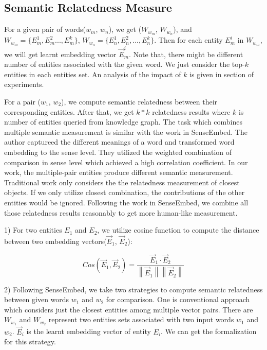

\subsection{Semantic Relatedness Measure}
\label{sec:measure}
For a given pair of words($w_m$, $w_n$), we get ($W_{w_m}$, $W_{w_n}$), and $W_{w_m}=\{E_m^1,E_m^2...,E_m^k\}$,
$W_{w_n}=\{E_n^1,E_n^2,...,E_n^k\}$. Then for each entity $E_m^i$ in $W_{w_m}$, we will get learnt embedding vector
$\overrightarrow E_m^i$.
Note that, there might be different number of entities associated with the given
word. We just consider the top-$k$ entities in each entities set. An analysis of the impact of $k$ is
given in section of experiments.

For a pair ($w_1$, $w_2$), we compute semantic relatedness between their corresponding entities. After that, we
get $k*k$ relatedness results where $k$ is number of entities queried from knowledge graph.
The task which combines multiple semantic measurement is similar with the work in SenseEmbed\cite{acl/IacobacciPN15}.
The author captureed the different meanings of a word and transformed word embedding to the sense level.
They utilized the weighted combination of comparison in sense level which achieved a high correlation coefficient.
In our work, the multiple-pair entities produce different semantic measurement. Traditional work only considers the
the relatedness measurement of closest objects. If we only utilize closest combination, the contributions of the other
entities would be ignored. Following the work in SenseEmbed, we combine all those relatedness
results reasonably to get more human-like measurement.

1) For two entities $E_1$ and $E_2$, we utilize cosine function to compute the
distance between two embedding vectors($\overrightarrow E_1$, $\overrightarrow E_2$):

\begin{small}
    \begin{equation}
        \label{cos}
        \nonumber
        Cos(\overrightarrow E_1,\overrightarrow E_2) = \frac{\overrightarrow E_1 \cdot 
        \overrightarrow E_2}{\left \| \overrightarrow E_1 \right \|\left \| \overrightarrow E_2 \right \|}
    \end{equation}
\end{small}

2) Following SenseEmbed, we take two strategies to compute semantic relatedness between given
words $w_1$ and $w_2$ for comparison. One is conventional approach \cite{BudanitskyH06} which considers just the closest entities
among multiple vector pairs. There are $W_{w_1}$ and $W_{w_2}$ represent two entities sets associated with two
input words $w_1$ and $w_2$. $\overrightarrow E_i$ is the learnt embedding vector of entity $E_i$. We can get the
formalization for this strategy.

